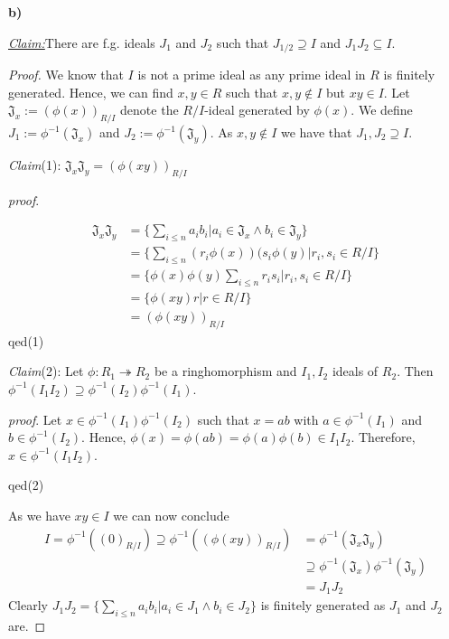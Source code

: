 \documentclass{article}
\newcommand{\inv}[1]{{#1}^{-1}}
\newcommand{\claim}
{\underline{\textit{Claim:}}\hspace{0,2cm}}
\newcommand{\subclaim}[1]
{

	\vspace*{0,2cm}
	\textit{Claim}({#1}):
}
\newcommand{\subqed}[1]{\hfill\textsf{qed}({#1})}
\newcommand{\subproof}{

\noindent\textit{proof}.\hspace{0,1cm}
}
\newcommand{\teilaufgabe}[1]{
{       

	\noindent\hspace*{0,1 cm}\textbf{#1)}
}
}
\theoremstyle{definition}
\theoremstyle{plain}
\theoremstyle{remark}
\begin{document}
	\teilaufgabe{b}\claim There are f.g. ideals $J_1$ and $J_2$ such that $J_{1/2}\supseteq I$ and $J_1J_2\subseteq I$.
\begin{proof}
	We know that $I$ is not a prime ideal as any prime ideal in $R$ is finitely generated. Hence, we can find $x,y\in R$ such that $x,y\notin I$ but $xy\in I$. Let $\mathfrak{J}_x:= (\phi(x))_{R/I}$ denote the $R/I$-ideal generated by $\phi(x)$.
	We define $J_1 := \inv{\phi}(\mathfrak{J}_x)$ and $J_2 := \inv{\phi}(\mathfrak{J}_{y})$. As $x,y\notin I$ we have that $J_1,J_2\supseteq I$. 
	\subclaim1 $\mathfrak{J}_x\mathfrak{J}_y = (\phi(xy))_{R/I}$
	\subproof 
	\begin{align}
		\mathfrak{J}_x\mathfrak{J}_y 	&= \{\sum_{i\leq n}a_ib_i|a_i\in \mathfrak{J}_x \wedge b_i\in \mathfrak{J}_y\} \\
						&= \{\sum_{i\leq n}(r_i\phi(x))(s_i\phi(y)|r_i,s_i\in R/I\} \\
						&= \{\phi(x)\phi(y)\sum_{i\leq n}r_is_i|r_i,s_i\in R/I\} \\
						&= \{\phi(xy) r|r\in R/I\}\\
						&= (\phi(xy))_{R/I}
	\end{align}
\subqed1 
\subclaim2 Let $\phi:R_1\twoheadrightarrow R_2$ be a ringhomorphism and $I_1, I_2$ ideals of $R_2$. Then $\inv{\phi}(I_1 I_2) \supseteq \inv{\phi}(I_2)\inv{\phi}(I_1)$.
\subproof Let $x\in \inv{\phi}(I_1)\inv{\phi}(I_2)$ such that $x = ab$ with $a\in \inv{\phi}(I_1)$ and $b\in\inv{\phi}(I_2)$. Hence, $\phi(x)=\phi(ab)=\phi(a)\phi(b)\in I_1I_2$. Therefore, $x\in \phi^{-1}(I_1I_2)$.

\subqed2

	As we have $xy\in I$ we can now conclude
	\begin{align}
		I=\inv{\phi}((0)_{R/I})\supseteq \inv{\phi}((\phi(xy))_{R/I}) &= \inv{\phi}(\mathfrak{J}_x\mathfrak{J}_y) \\
							&\supseteq \phi^{-1}(\mathfrak{J}_x)\inv{\phi}(\mathfrak{J}_y)\\
							&= J_1J_2
	\end{align}
	Clearly $J_1J_2=\{\sum_{i\leq n }a_ib_i|a_i\in J_1\wedge b_i\in J_2\}$ is finitely generated as $J_1$ and $J_2$ are.
\end{proof}	
\end{document}
